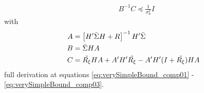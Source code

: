 \documentclass[oneside,12pt]{article}
\begin{document}
%
%
\begin{equation}\label{eq:verySimpleBound}
    \begin{split}
          &B^{-1}C  \preceq \frac{1}{\sigma_u^2} I
    \end{split}
\end{equation}
%
with
%
\begin{equation}
    \begin{split}
          A &= \left[ H' \Bar{\Sigma} H + R\right]^{-1}H'\Bar{\Sigma}\\
          B &= \Bar{\Sigma} H A\\
          C &= \tilde{R_\xi} H A + A' H' \tilde{R_\xi} - A'H'(I+\tilde{R_\xi})H A
    \end{split}
\end{equation}
%
full derivation at equations \ref{eq:verySimpleBound_comp01} - \ref{eq:verySimpleBound_comp03}.
%
\end{document}
